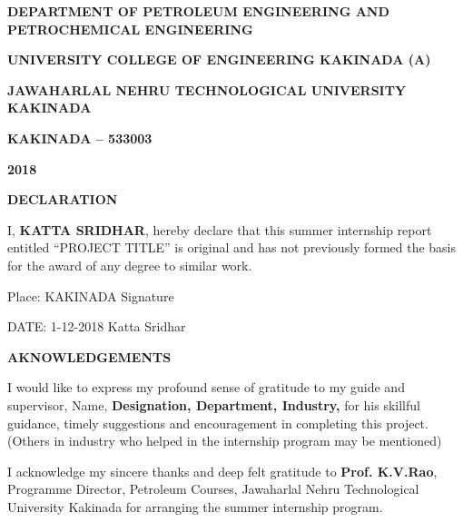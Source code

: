 \documentclass[11pt,a4paper]{article}
\begin{document}
\begin{titlepage}
\begin{center}
\vspace{1em}

\doublespacing

\large \textbf{DEPARTMENT OF PETROLEUM ENGINEERING AND \\ 
PETROCHEMICAL ENGINEERING}

\large \textbf{UNIVERSITY COLLEGE OF ENGINEERING KAKINADA (A)}

\large \textbf{JAWAHARLAL NEHRU TECHNOLOGICAL UNIVERSITY KAKINADA}

\large \textbf{KAKINADA – 533003}

\large \textbf{2018}

\end{center}
\end{titlepage}

\newpage

\begin{center}
\textbf{DECLARATION}
\end{center}

\vspace{4em}


I, \textbf{KATTA SRIDHAR}, hereby declare that this summer internship report entitled “PROJECT TITLE” is original and has not previously formed the basis for the award of any degree to similar work.


\vspace{5em}

\noindent Place: KAKINADA  \hfill Signature     \hspace{0.02\textwidth}

\vspace{1em}

\noindent DATE: 1-12-2018  \hfill Katta Sridhar


\newpage

\begin{center}
\textbf{AKNOWLEDGEMENTS}
\end{center}


\vspace{1em}

I would like to express my profound sense of gratitude to my guide and supervisor, Name, \textbf{Designation, Department, Industry,} for his skillful guidance, timely suggestions and encouragement in completing this project. (Others in industry who helped in the internship program may be mentioned)

\vspace{1em}


I acknowledge my sincere thanks and deep felt gratitude to \textbf{Prof. K.V.Rao}, Programme Director, Petroleum Courses, Jawaharlal Nehru Technological University Kakinada for arranging the summer internship program.
\end{document}
